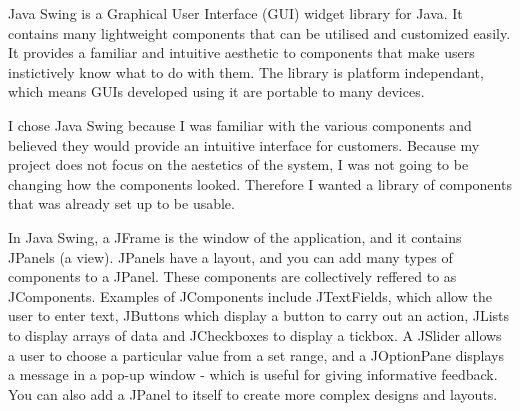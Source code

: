 Java Swing \cite{java_swing_2020} is a Graphical User Interface (GUI) widget library for Java. It contains many lightweight components that can be utilised and customized easily. It provides a familiar and intuitive aesthetic to components that make users instictively know what to do with them. The library is platform independant, which means GUIs developed using it are portable to many devices.

I chose Java Swing because I was familiar with the various components and believed they would provide an intuitive interface for customers. Because my project does not focus on the aestetics of the system, I was not going to be changing how the components looked. Therefore I wanted a library of components that was already set up to be usable. 

In Java Swing, a JFrame is the window of the application, and it contains JPanels (a view). JPanels have a layout, and you can add many types of components to a JPanel. These components are collectively reffered to as JComponents. Examples of JComponents include JTextFields, which allow the user to enter text, JButtons which display a button to carry out an action, JLists to display arrays of data and JCheckboxes to display a tickbox. A JSlider allows a user to choose a particular value from a set range, and a JOptionPane displays a message in a pop-up window - which is useful for giving informative feedback. You can also add a JPanel to itself to create more complex designs and layouts.

